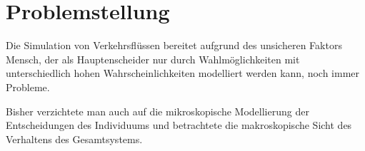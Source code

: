 \section{Problemstellung}
\label{sec:problemstellung}

Die Simulation von Verkehrsflüssen bereitet aufgrund des unsicheren Faktors Mensch, der als Hauptenscheider nur durch Wahlmöglichkeiten mit unterschiedlich hohen Wahrscheinlichkeiten modelliert werden kann, noch immer Probleme.

Bisher verzichtete man auch auf die mikroskopische Modellierung der Entscheidungen des Individuums und betrachtete die makroskopische Sicht des Verhaltens des Gesamtsystems.